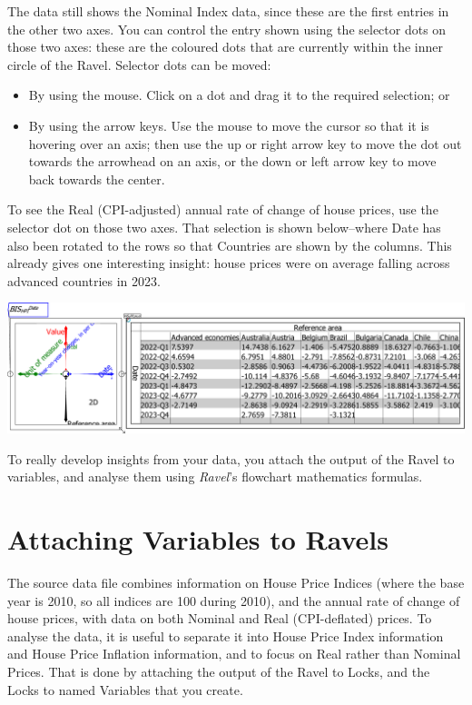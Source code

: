 The data still shows the Nominal Index data, since these are the first
entries in the other two axes. You can control the entry shown using
the selector dots on those two axes: these are the coloured dots that
are currently within the inner circle of the Ravel. Selector dots
can be moved:
\begin{itemize}
\item By using the mouse. Click on a dot and drag it to the required selection;
or 
\item By using the arrow keys. Use the mouse to move the cursor so that
it is hovering over an axis; then use the up or right arrow key to
move the dot out towards the arrowhead on an axis, or the down or
left arrow key to move back towards the center. 
\end{itemize}
To see the Real (CPI-adjusted) annual rate of change of house prices,
use the selector dot on those two axes. That selection is shown below--where
Date has also been rotated to the rows so that Countries are shown
by the columns. This already gives one interesting insight: house
prices were on average falling across advanced countries in 2023.

\noindent\includegraphics[width=\textwidth]{images/tut04HPI4DwithSheetRotatedCountryDateRealChange}

To really develop insights from your data, you attach the output of
the Ravel to variables, and analyse them using \emph{Ravel}'s flowchart
mathematics formulas.

\section{Attaching Variables to Ravels}

The source data file combines information on House Price Indices (where
the base year is 2010, so all indices are 100 during 2010), and the
annual rate of change of house prices, with data on both Nominal and
Real (CPI-deflated) prices. To analyse the data, it is useful to separate
it into House Price Index information and House Price Inflation information,
and to focus on Real rather than Nominal Prices. That is done by attaching
the output of the Ravel to Locks, and the Locks to named Variables
that you create.

